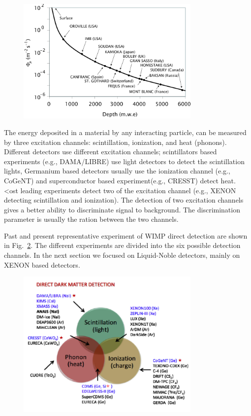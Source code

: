 \begin{figure}[]
	\centering
	\includegraphics[width=0.8\textwidth]{figs/muones.png}
	\label{fig:MuonRed}
\end{figure}

The energy deposited in a material by any interacting particle, can be measured by three excitation channels: scintillation, ionization, and heat (phonons). Different detectors use different excitation channels; scintillators based experiments (e.g., DAMA/LIBRE) use light detectors to detect the scintillation lights, Germanium based detectors usually use the ionization channel (e.g., CoGeNT) and superconductor based experiment(e.g., CRESST) detect heat. <ost leading experiments detect two of the excitation channel (e.g., XENON detecting scintillation and ionization). The detection of two excitation channels gives a better ability to discriminate signal to background. The discrimination parameter is usually the ration between the two channels.  

Past and present representative experiment of WIMP direct detection are shown in Fig.~\ref{fig:det_strategy}. The different experiments are divided into the six possible detection channels. In the next section we focused on Liquid-Noble detectors, mainly on XENON based detectors.  

\begin{figure}[]
	\centering
	\includegraphics[width=0.8\textwidth]{figs/DetChannels.png}
	\label{fig:det_strategy}
\end{figure}

